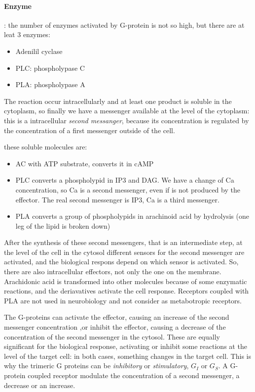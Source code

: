 \documentclass[a4paper, 12pt]{book}
\begin{document}
\paragraph{Enzyme}: the number of enzymes activated by G-protein is not so high, but there are at leat 3 enzymes:
\begin{itemize}
\item{Adenilil cyclase}
\item{PLC: phospholypase C}
\item{PLA: phospholypase A}
\end{itemize}
The reaction occur intracellularly and at least one product is soluble in the cytoplasm, so finally we have a messenger available at the level of the cytoplasm: this is a intracellular \emph{second messanger}, because its concentration is regulated by the concentration of a first messenger outside of the cell.

these soluble molecules are:
\begin{itemize}
\item{AC with ATP substrate, converts it in cAMP}
\item{PLC converts a phospholypid in IP3 and DAG. We have a change of Ca concentration, so Ca is a second messenger, even if is not produced by the effector. The real second messenger is IP3, Ca is a third messenger.}
\item{PLA  converts a group of phospholypids in arachinoid acid by hydrolysis (one leg of the lipid is broken down)}
\end{itemize}
 After the synthesis of these second messengers, that is an intermediate step, at the level of the cell in the cytosol different sensors for the second messenger are activated, and the biological respons depend on which sensor is activated. So, there are also intracellular effectors, not only the one on the membrane. Arachidonic acid is transformed into other molecules because of some enzymatic reactions, and the deriavatives activate the cell response. Receptors coupled with PLA are not used in neurobiology and not consider as metabotropic receptors.

The G-proteins can activate the effector, causing an increase of the second messenger concentration ,or inhibit the effector, causing a decrease of the concentration of the second messenger in the cytosol. These are equally significant for the biological response, activating or inhibit some reactions at the level of the target cell: in both cases, something changes in the target cell. This is why the trimeric G proteins can be \emph{inhibitory} or 	\emph{stimulatory}, $G_I$ or $G_S$.  A G-protein coupled receptor modulate the concentration of a second messenger, a decrease or an increase.
\end{document}
